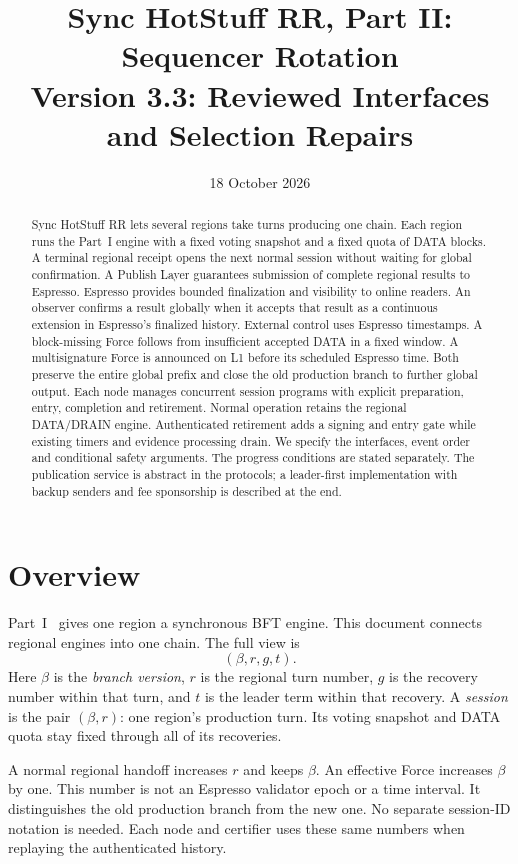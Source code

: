 \documentclass[11pt,a4paper]{article}
\title{Sync HotStuff RR, Part II: Sequencer Rotation\\\large Version 3.3: Reviewed Interfaces and Selection Repairs}
\author{}\date{18 October 2026}
\newcommand{\defterm}[1]{\textcolor{rrBlue}{\textit{#1}}}
\newcounter{protocol}
\begin{document}
\maketitle
\begin{abstract}
Sync HotStuff RR lets several regions take turns producing one chain.
Each region runs the Part~I engine with a fixed voting snapshot and a
fixed quota of DATA blocks. A terminal regional receipt opens the next
normal session without waiting for global confirmation. A Publish Layer
guarantees submission of complete regional results to Espresso. Espresso
provides bounded finalization and visibility to online readers. An observer confirms a result
globally when it accepts that result as a continuous extension in
Espresso's finalized history. External control uses Espresso timestamps.
A block-missing Force follows from insufficient accepted DATA in a fixed
window. A multisignature Force is announced on L1 before its scheduled
Espresso time. Both preserve the entire global prefix and close the old
production branch to further global output. Each node manages concurrent session programs with explicit preparation,
entry, completion and retirement. Normal operation retains the regional
DATA/DRAIN engine. Authenticated retirement adds a signing and entry gate
while existing timers and evidence processing drain. We specify the
interfaces, event order and conditional safety arguments.
The progress conditions are stated separately. The publication service is
abstract in the protocols; a leader-first implementation with backup
senders and fee sponsorship is described at the end.
\end{abstract}

\section{Overview}
\label{sec:overview}
Part~I~\cite{part1} gives one region a synchronous BFT engine.
This document connects regional engines into one chain. The full view is
\[
 (\beta,r,g,t).
\]
Here $\beta$ is the \defterm{branch version}, $r$ is the regional turn
number, $g$ is the recovery number within that turn, and $t$ is the
leader term within that recovery. A \defterm{session} is the pair
$(\beta,r)$: one region's production turn. Its voting snapshot and DATA
quota stay fixed through all of its recoveries.

A normal regional handoff increases $r$ and keeps $\beta$.
An effective Force increases $\beta$ by one. This number is not an
Espresso validator epoch or a time interval. It distinguishes the old
production branch from the new one. No separate session-ID notation is
needed. Each node and certifier uses these same numbers when replaying
the authenticated history.
\end{document}
